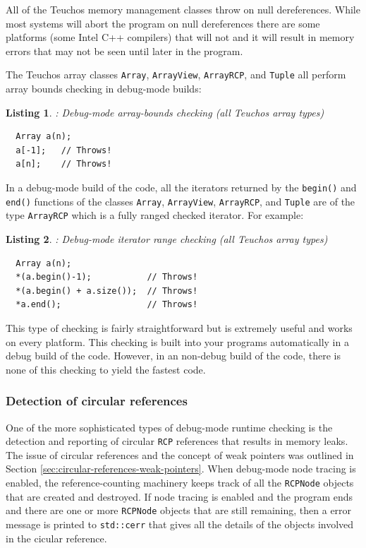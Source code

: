\documentclass[pdf,ps2pdf,11pt]{SANDreport}
\newtheorem{listing}{Listing}
\begin{document}
All of the Teuchos memory management classes throw on null
dereferences.  While most systems will abort the program on null
dereferences there are some platforms (some Intel C++ compilers) that
will not and it will result in memory errors that may not be seen
until later in the program.

The Teuchos array classes {}\texttt{Array}, {}\texttt{ArrayView},
{}\texttt{ArrayRCP}, and {}\texttt{Tuple} all perform array bounds
checking in debug-mode builds:

\begin{listing}: Debug-mode array-bounds checking (all Teuchos array types) \\
\label{listing:array-bounds-checking}
{\small\begin{verbatim}
  Array a(n);
  a[-1];   // Throws!
  a[n];    // Throws!
\end{verbatim}}
\end{listing}

In a debug-mode build of the code, all the iterators returned by the
{}\texttt{begin()} and {}\texttt{end()} functions of the classes
{}\texttt{Array}, {}\texttt{ArrayView}, {}\texttt{ArrayRCP}, and
{}\texttt{Tuple} are of the type {}\texttt{ArrayRCP} which is a fully
ranged checked iterator.  For example:

\begin{listing}: Debug-mode iterator range checking (all Teuchos array types) \\
\label{listing:iterator-checking}
{\small\begin{verbatim}
  Array a(n);
  *(a.begin()-1);           // Throws!
  *(a.begin() + a.size());  // Throws!
  *a.end();                 // Throws!
\end{verbatim}}
\end{listing}

This type of checking is fairly straightforward but is extremely
useful and works on every platform.  This checking is built into your
programs automatically in a debug build of the code.  However, in an
non-debug build of the code, there is none of this checking to yield
the fastest code.


%
{}\subsubsection{Detection of circular references}
\label{sec:detection-circular-references}
%

One of the more sophisticated types of debug-mode runtime checking is
the detection and reporting of circular {}\texttt{RCP} references that
results in memory leaks.  The issue of circular references and the
concept of weak pointers was outlined in Section
{}\ref{sec:circular-references-weak-pointers}.  When debug-mode node
tracing is enabled, the reference-counting machinery keeps track of
all the {}\texttt{RCPNode} objects that are created and destroyed.  If
node tracing is enabled and the program ends and there are one or more
{}\texttt{RCPNode} objects that are still remaining, then a error
message is printed to {}\texttt{std::cerr} that gives all the details
of the objects involved in the cicular reference.
\end{document}
